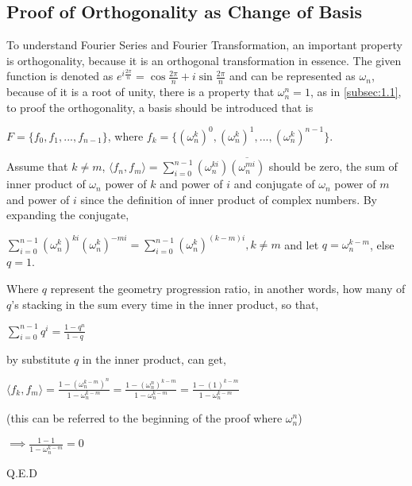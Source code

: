 \documentclass[12pt]{article}
\begin{document}
		
		\subsection{Proof of Orthogonality as Change of Basis}
			
			To understand Fourier Series and Fourier Transformation, an important property is orthogonality, because it is an orthogonal transformation in essence. The given function is denoted as $e^{i \frac{2\pi}{n}} = \cos \frac{2\pi}{n} + i\sin \frac{2\pi}{n}$ and can be represented as $\omega_{n}$, because of it is a root of unity, there is a property that $\omega_{n}^{n} = 1$, as in \ref{subsec:1.1}, to proof the orthogonality, a basis should be introduced that is 
			
			\begin{center}
				\centering
		
				$F = \{f_{0}, f_{1}, ..., f_{n -1}\}$, where $f_{k} = \{(\omega_{n}^{k})^{0}, (\omega_{n}^{k})^{1}, ..., (\omega_{n}^{k})^{n-1}\}$. 
			\end{center}
			Assume that $k \neq m$, $\langle f_{n},f_{m}\rangle = \sum_{i=0}^{n-1}(\omega_{n}^{ki})\overline{(\omega_{n}^{mi})}$ should be zero, the sum of inner product of $\omega_{n}$ power of $k$ and power of $i$ and conjugate of $\omega_{n}$ power of $m$ and power of $i$ since the definition of inner product of complex numbers. By expanding the conjugate, 
			\begin{center}
			\centering
				$\sum_{i=0}^{n-1}(\omega_{n}^{k})^{ki}(\omega_{n}^{k})^{-mi} = \sum_{i=0}^{n-1}(\omega_{n}^{k})^{(k-m)i}, k \neq m$ and let $q = \omega_{n}^{k - m}$, else $q=1$. 
			\end{center}
			Where $q$ represent the geometry progression ratio, in another words, how many of $q$'s stacking in the sum every time in the inner product, so that,
			
			\begin{center}
			\centering
				$\sum_{i=0}^{n-1}q^{i} = \frac{1-q^{n}}{1-q}$
				
			\end{center}
			
			by substitute $q$ in the inner product, can get,
			\begin{center}
				\centering
				$\langle f_{k}, f_{m} \rangle = \frac{1-(\omega_{n}^{k-m})^{n}}{1-\omega_{n}^{k-m}} = \frac{1-(\omega_{n}^{n})^{k-m}}{1-\omega_{n}^{k-m}} = \frac{1-(1)^{k-m}}{1-\omega_{n}^{k-m}}$ 
				
				(this can be referred to the beginning of the proof where $\omega_{n}^{n}$)
				
				$\implies \frac{1-1}{1-\omega_{n}^{k-m}} = 0$
				
				Q.E.D
			\end{center}
		
\end{document}
